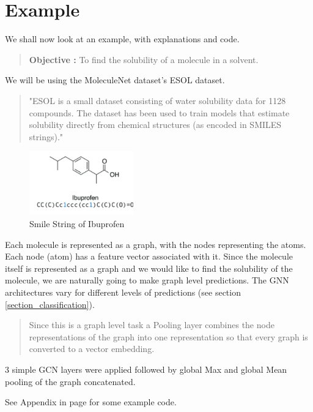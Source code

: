 \section{Example}
We shall now look at an example, with explanations and code.
\begin{quote}
    \textbf{Objective :} To find the solubility of a molecule in a solvent. 
\end{quote}
We will be using the MoleculeNet \cite{noauthor_torch_geometricdatasets_nodate} dataset's ESOL dataset. 
\begin{quote}
    "ESOL is a small dataset consisting of water solubility data for 1128 compounds. The dataset has been used to train models that estimate solubility directly from chemical structures (as encoded in SMILES strings)."
\end{quote}
\begin{figure}
     \centering
     \includegraphics[width= 0.4\textwidth]{pics/smile.png}
     \caption{Smile String of Ibuprofen}
     \label{Smile}
\end{figure}
Each molecule is represented as a graph, with the nodes representing the atoms. Each node (atom) has a feature vector associated with it. Since the molecule itself is represented as a graph and we would like to find the solubility of the molecule, we are naturally going to make graph level predictions. The GNN architectures vary for different levels of predictions (see section \ref{section_classification}). 

\begin{quote}
    Since this is a graph level task a Pooling layer combines the node representations of the graph into one representation so that every graph is converted to a vector embedding.
\end{quote}

3 simple GCN layers were applied followed by global Max and global Mean pooling of the graph concatenated. 

See Appendix in page \pageref{appsrccode} for some example code.